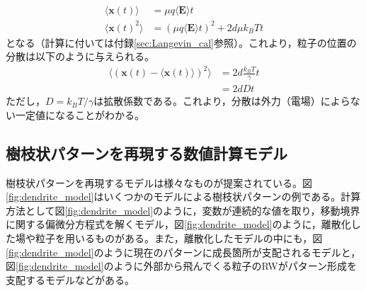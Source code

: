 \documentclass[autodetect-engine,dvi=dvipdfmx,a4paper,ja=standard,oneside,openany,11pt]{bxjsbook}
\begin{document}
\begin{equation}
  \begin{split}
    \langle\bm{x}(t)\rangle   & =\mu q\langle\bm{E}\rangle t                    \\
    \langle\bm{x}(t)^2\rangle & =(\mu q \langle\bm{E}\rangle t)^2+2d\mu k_B T t
  \end{split}
  \label{eq:Langevin_overdamped_average}
\end{equation}
となる（計算に付いては付録\ref{sec:Langevin_cal}参照）。これより，粒子の位置の分散は以下のように与えられる。
\begin{equation}
  \begin{split}
    \langle(\bm{x}(t)-\langle\bm{x}(t)\rangle)^2\rangle & =2d \frac{k_B T}{\gamma} t \\
                                                        & =2dDt
  \end{split}
  \label{eq:Langevin_overdamped_variance}
\end{equation}
ただし，$D=k_B T/\gamma$は拡散係数である。これより，分散は外力（電場）によらない一定値になることがわかる。

\subsection{樹枝状パターンを再現する数値計算モデル}
樹枝状パターンを再現するモデルは様々なものが提案されている。図\ref{fig:dendrite_model}はいくつかのモデルによる樹枝状パターンの例である。計算方法として図\ref{fig:dendrite_model}のように，変数が連続的な値を取り，移動境界に関する偏微分方程式を解くモデル，図\ref{fig:dendrite_model}のように，離散化した場や粒子を用いるものがある。また，離散化したモデルの中にも，図\ref{fig:dendrite_model}のように現在のパターンに成長箇所が支配されるモデルと，図\ref{fig:dendrite_model}のように外部から飛んでくる粒子のRWがパターン形成を支配するモデルなどがある。
\end{document}
